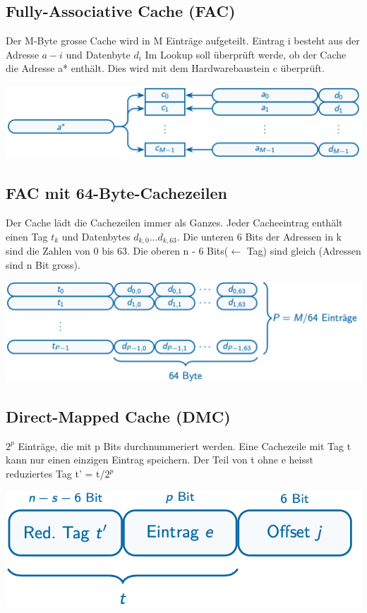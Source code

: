 \documentclass[8pt,landscape,a4paper]{scrartcl}
\begin{document}
\begin{multicols*}{5}
\subsection{Fully-Associative Cache (FAC)}
Der M-Byte grosse Cache wird in M Einträge aufgeteilt. Eintrag i besteht aus der Adresse $a-i$ und Datenbyte $d_i$
Im Lookup soll überprüft werde, ob der Cache die Adresse a* enthält. Dies wird mit dem Hardwarebaustein c überprüft.
\begin{center}
	\includegraphics[scale=.25]{Graphic/FAC}
\end{center}
\subsection{FAC mit 64-Byte-Cachezeilen}
Der Cache lädt die Cachezeilen immer als Ganzes. Jeder Cacheeintrag enthält einen \textcolor{b}{Tag $t_k$} und \textcolor{b}{Datenbytes $d_{k,0}...d_{k,63}$}. Die unteren 6 Bits der Adressen in k sind die Zahlen von 0 bis 63. Die oberen n - 6 Bits($\leftarrow$ Tag) sind gleich (Adressen sind n Bit gross).
\begin{center}
	\includegraphics[scale=.25]{Graphic/FAC64}
\end{center}
\subsection{Direct-Mapped Cache (DMC)}
$2^p$ Einträge, die mit p Bits durchnummeriert werden. Eine Cachezeile mit Tag t kann nur einen einzigen Eintrag speichern. Der Teil von t ohne e heisst reduziertes Tag t' = t/$2^p$
\begin{center}
	\includegraphics[scale=.36]{Graphic/DMC}
\end{center}

\end{multicols*}
\end{document}
